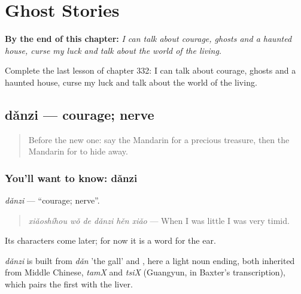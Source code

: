 
\chapter{Ghost Stories}
\label{ch:zh-ghost-stories}

\begin{chapteropening}
\textbf{By the end of this chapter:} \emph{I can talk about courage, ghosts and a haunted house, curse my luck and talk about the world of the living.}

Complete the last lesson of chapter 332: I can talk about courage, ghosts and a haunted house, curse my luck and talk about the world of the living.
\end{chapteropening}

\section[dǎnzi]{dǎnzi — courage; nerve}

\label{lesson:ZH-C332-danzi}



\begin{quote}
Before the new one: say the Mandarin for a precious treasure, then the Mandarin for to hide away.
\end{quote}

\subsection*{You'll want to know: dǎnzi}
\emph{dǎnzi} — \textquotedblleft{}courage; nerve\textquotedblright{}.

\begin{quote}
\emph{xiǎoshíhou wǒ de dǎnzi hěn xiǎo} — When I was little I was very timid.
\end{quote}

Its characters come later; for now it is a word for the ear.

\begin{cousinweb}
\emph{dǎnzi} is built from \emph{dǎn} 'the gall' and , here a light noun ending, both inherited from Middle Chinese, \emph{tamX} and \emph{tsiX} (Guangyun, in Baxter's transcription), which pairs the first with the liver.
\end{cousinweb}

